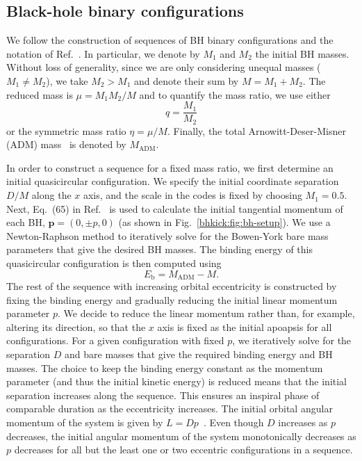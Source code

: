 \subsection{Black-hole binary configurations}
%
\label{bhkick:sec:configs}
%
We follow the construction of sequences of BH binary configurations
and the notation of Ref.~\cite{Sperhake:2007gu}. In particular, we 
denote by $M_1$ 
and $M_2$ the initial BH masses. Without loss of generality, since 
we are only considering unequal masses ($M_1 \neq M_2$), we take $M_2 > M_1$
and denote their sum by $M = M_1 + M_2$. The reduced mass is 
$\mu = M_1 M_2 /M$ and to quantify the mass ratio, we use either
\begin{equation}
    q = \frac{M_1}{M_2}
    \label{bhkick:eq:mass-ratio}
\end{equation}
or the symmetric mass ratio $\eta = \mu/M$. Finally, the 
total Arnowitt-Deser-Misner (ADM) mass~\cite{Arnowitt:1962hi} is denoted by 
$M_{\mathrm{ADM}}$.


In order to construct a sequence for a fixed mass ratio, we first 
determine an initial quasicircular configuration. We specify the initial
coordinate separation $D/M$ along the $x$ axis, and the scale in the codes 
is fixed by choosing $M_1=0.5$. Next, Eq.~(65) in 
Ref.~\cite{Brugmann:2008zz} is used to calculate the initial tangential 
momentum of each BH, $\mathbf{p}=(0,\pm p,0)$ (as shown in 
Fig.~\ref{bhkick:fig:bh-setup}). We use a 
Newton-Raphson method to iteratively solve for the Bowen-York bare mass 
parameters that give the desired BH masses. The binding energy 
of this quasicircular configuration is then computed using
\begin{equation}
    E_{\mathrm{b}}=M_{\mathrm{ADM}}-M.\label{bhkick:eq:binding-energy}
\end{equation}
The rest of the sequence with increasing orbital eccentricity is 
constructed by fixing the binding energy and gradually reducing the initial
linear momentum parameter $p$.
We decide to reduce the linear momentum rather than, for example, 
altering its direction,
so that the $x$ axis is fixed as the initial apoapsis for all configurations.
For a given configuration with fixed $p$, we 
iteratively solve for the separation $D$ and bare masses that give the 
required binding energy and BH masses. The choice to keep the 
binding energy constant as the momentum parameter (and thus the initial 
kinetic energy) is reduced means that the initial separation increases along 
the sequence. This ensures an inspiral phase of comparable duration as the 
eccentricity increases.
The initial orbital angular momentum of the system 
is given by $L=Dp$~\cite{York:1989jn}. Even though $D$ increases as $p$ 
decreases, the initial angular momentum of the system monotonically decreases 
as $p$ decreases for all but the least one or two eccentric configurations 
in a sequence.


